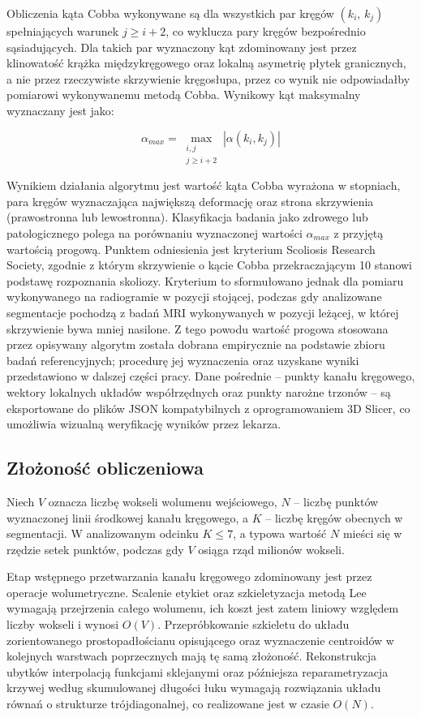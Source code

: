 Obliczenia kąta Cobba wykonywane są dla wszystkich par kręgów $(k_i,\, k_j)$ spełniających warunek $j \geq i + 2$, co wyklucza pary kręgów bezpośrednio sąsiadujących.
Dla takich par wyznaczony kąt zdominowany jest przez klinowatość krążka międzykręgowego oraz lokalną asymetrię płytek granicznych, a nie przez rzeczywiste skrzywienie kręgosłupa, przez co wynik nie odpowiadałby pomiarowi wykonywanemu metodą Cobba. Wynikowy kąt maksymalny wyznaczany jest jako:

\begin{equation} \label{eq:max_cobb}
    \alpha_{max} = \max_{\substack{i,j \\ j \geq i+2}} |\alpha(k_i, k_j)|
\end{equation}

Wynikiem działania algorytmu jest wartość kąta Cobba wyrażona w stopniach, para kręgów wyznaczająca największą deformację oraz strona skrzywienia (prawostronna lub lewostronna).
Klasyfikacja badania jako zdrowego lub patologicznego polega na porównaniu wyznaczonej wartości $\alpha_{max}$ z przyjętą wartością progową.
Punktem odniesienia jest kryterium Scoliosis Research Society, zgodnie z którym skrzywienie o kącie Cobba przekraczającym 10\degree{} stanowi podstawę rozpoznania skoliozy.
Kryterium to sformułowano jednak dla pomiaru wykonywanego na radiogramie w pozycji stojącej, podczas gdy analizowane segmentacje pochodzą z badań MRI wykonywanych w pozycji leżącej, w której skrzywienie bywa mniej nasilone.
Z tego powodu wartość progowa stosowana przez opisywany algorytm została dobrana empirycznie na podstawie zbioru badań referencyjnych; procedurę jej wyznaczenia oraz uzyskane wyniki przedstawiono w dalszej części pracy.
Dane pośrednie -- punkty kanału kręgowego, wektory lokalnych układów współrzędnych oraz punkty narożne trzonów -- są eksportowane do plików JSON kompatybilnych z oprogramowaniem 3D Slicer, co umożliwia wizualną weryfikację wyników przez lekarza.
\subsection{Złożoność obliczeniowa}
\label{subsec:zlozonosc-skolioza}

Niech $V$ oznacza liczbę wokseli wolumenu wejściowego, $N$ -- liczbę punktów wyznaczonej linii środkowej kanału kręgowego, a $K$ -- liczbę kręgów obecnych w segmentacji.
W analizowanym odcinku $K \leq 7$, a typowa wartość $N$ mieści się w rzędzie setek punktów, podczas gdy $V$ osiąga rząd milionów wokseli.

Etap wstępnego przetwarzania kanału kręgowego zdominowany jest przez operacje wolumetryczne.
Scalenie etykiet oraz szkieletyzacja metodą Lee wymagają przejrzenia całego wolumenu, ich koszt jest zatem liniowy względem liczby wokseli i wynosi $O(V)$.
Przepróbkowanie szkieletu do układu zorientowanego prostopadłościanu opisującego oraz wyznaczenie centroidów w kolejnych warstwach poprzecznych mają tę samą złożoność.
Rekonstrukcja ubytków interpolacją funkcjami sklejanymi oraz późniejsza reparametryzacja krzywej według skumulowanej długości łuku wymagają rozwiązania układu równań o strukturze trójdiagonalnej, co realizowane jest w czasie $O(N)$.

